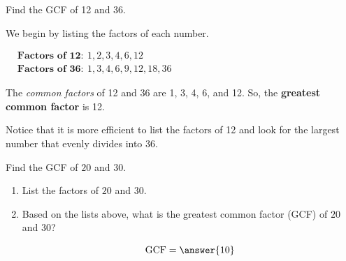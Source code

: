 \documentclass{ximera}[font=12pt]  %
\begin{document}
\begin{example}

Find the GCF of 12 and 36. 

\begin{explanation}

We begin by listing the factors of each number.

\begin{flushleft}
\hspace*{8em} %
$\begin{aligned}
& \textbf{Factors of 12}: \ 1, 2, 3, 4, 6, 12 \\[1.5ex]
& \textbf{Factors of 36}: \ 1, 3, 4, 6, 9, 12, 18, 36
\end{aligned}$
\end{flushleft}

The \textit{common factors} of 12 and 36 are 1, 3, 4, 6, and 12.  So, the \textbf{greatest common factor} is 12.  


\begin{remark}
Notice that it is more efficient to list the factors of 12 and look for the largest number that evenly divides into 36.  
\end{remark}

\end{explanation}

\end{example}


\begin{problem}
Find the GCF of $20$ and $30.$ 

\begin{enumerate}
\item List the factors of $20$ and $30.$

\begin{multipleChoice}
\end{multipleChoice}

\item Based on the lists above, what is the greatest common factor (GCF) of $20$ and $30$?

\[ \text{GCF} = \answer{10} \]

\end{enumerate}

\end{problem}
\end{document}

